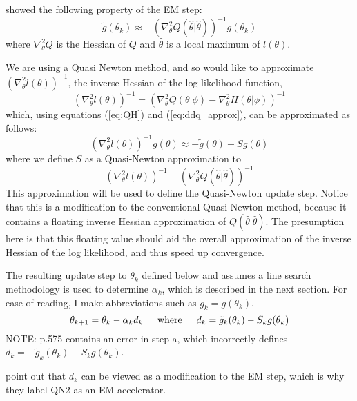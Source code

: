\documentclass[letter,12pt]{article}
\begin{document}
\cite{jamshidianj93} showed the following property of the EM step:
\begin{equation} \label{eq:ddq_approx}
\tilde{g}(\theta_k) \approx -(\nabla^2_{\theta}Q(\hat{\theta}|\hat{\theta}))^{-1}g(\theta_k)
\end{equation}
where $\nabla^2_{\theta}Q$ is the Hessian of $Q$ and $\hat{\theta}$ is a local maximum of $l(\theta)$.  

We are using a Quasi Newton method, and so would like to approximate  $(\nabla^2_{\theta}l(\theta))^{-1}$, the inverse Hessian of the log likelihood function, 
\[
(\nabla^2_{\theta}l(\theta))^{-1}
=
(\nabla^2_{\theta}Q(\theta|\phi)
-
\nabla^2_{\theta}H(\theta|\phi))^{-1}
\]
which, using equations (\ref{eq:QH}) and (\ref{eq:ddq_approx}), can be approximated as follows:
\[
(\nabla^2_{\theta}l(\theta))^{-1}g(\theta)
\approx
-\tilde{g}(\theta)
+
Sg(\theta)
\]
where we define $S$ as a Quasi-Newton approximation to
\[
(\nabla^2_{\theta}l(\theta))^{-1}-(\nabla^2_{\theta}Q(\hat{\theta}|\hat{\theta}))^{-1}
\]
This approximation will be used to define the Quasi-Newton update step.  Notice that this is a modification to the conventional Quasi-Newton method, because it contains a floating inverse Hessian approximation of $Q(\hat{\theta}|\hat{\theta})$.  The presumption here is that this floating value should aid the overall approximation of the inverse Hessian of the log likelihood, and thus speed up convergence.

The resulting update step to $\theta_k$ defined below and assumes a line search methodology is used to determine $\alpha_k$, which is described in the next section.  For ease of reading, I make abbreviations such as $g_k = g(\theta_k)$.
\[
\theta_{k+1} = \theta_k - \alpha_k d_k
\indent
\text{where}
\indent
d_k = \tilde{g}_k(\theta_k) - S_kg(\theta_k)
\]
NOTE: \cite{jamshidianj97} p.575 contains an error in step a, which incorrectly defines $d_k=-\tilde{g}_k(\theta_k) + S_kg(\theta_k)$.

\cite{jamshidianj97} point out that $d_k$ can be viewed as a modification to the EM step, which is why they label QN2 as an EM accelerator.
\end{document}
